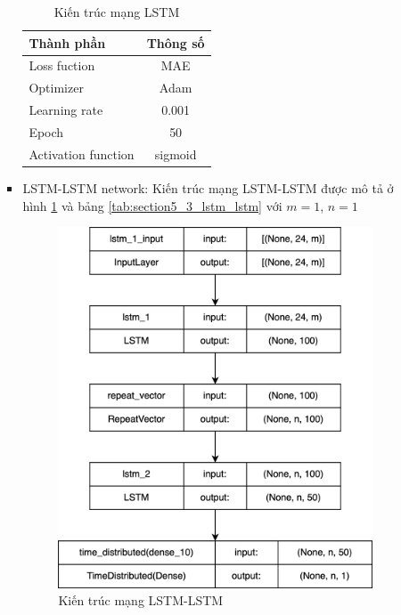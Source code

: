 \begin{itemize}
\begin{itemize}
\begin{itemize}
                    \begin{table}[h!]
                        \caption{Kiến trúc mạng LSTM}
                        \centering
                        \begin{tabular}{|l|c|}
                        \hline
                     Thành phần  &  Thông số \\
                          \hline
                     Loss fuction & MAE \\
                     Optimizer & Adam\\
                     Learning rate & 0.001 \\
                     Epoch & 50 \\
                    Activation function & sigmoid \\
                    \hline
                        \end{tabular}
                        \label{tab:section5_3-lstm}
                    \end{table}
                    

                    \newpage
                    \item LSTM-LSTM network: Kiến trúc mạng LSTM-LSTM được mô tả ở hình \ref{fig:section5_3_lstm_lstm} và bảng \ref{tab:section5_3_lstm_lstm} với $m=1$, $n=1$
                    
                    \begin{figure}[h!]
                        \centering
                        \includegraphics[width=0.6\linewidth]{image/section5_3/lstm-lstm.drawio.png}
                        \caption{Kiến trúc mạng LSTM-LSTM}
                        \label{fig:section5_3_lstm_lstm}
                    \end{figure}


\end{itemize}
\end{itemize}
\end{itemize}
